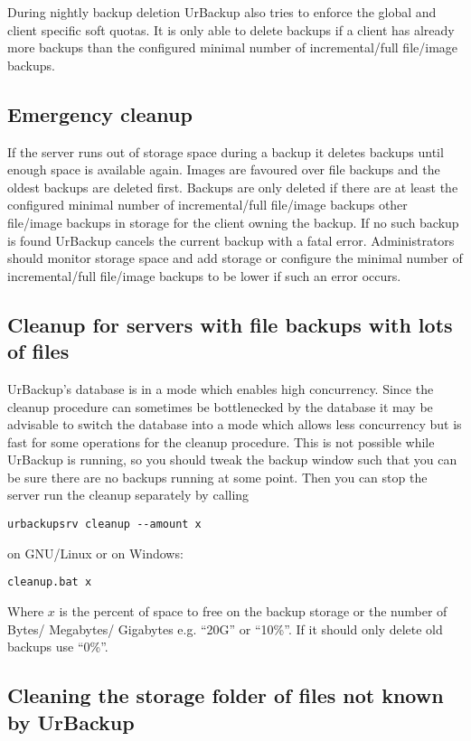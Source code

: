 \documentclass[a4paper,10pt]{article}
\begin{document}
During nightly backup deletion UrBackup also tries to enforce the global and client specific soft quotas. It is only able to delete backups if a client has already more backups than the configured minimal number of incremental/full file/image backups.

\subsection{Emergency cleanup}

If the server runs out of storage space during a backup it deletes backups until enough space is available again. Images are favoured over file backups and the oldest backups are deleted first. Backups are only deleted if there are at least the configured minimal number of incremental/full file/image backups other file/image backups in storage for the client owning the backup. If no such backup is found UrBackup cancels the current backup with a fatal error. Administrators should monitor storage space and add storage or configure the minimal number of incremental/full file/image backups to be lower if such an error occurs.

\subsection{Cleanup for servers with file backups with lots of files}

UrBackup's database is in a mode which enables high concurrency. Since the cleanup procedure
can sometimes be bottlenecked by the database it may be advisable to switch the database into
a mode which allows less concurrency but is fast for some operations for the cleanup procedure. This is not possible while UrBackup is running, so you should tweak the backup window such that you can be sure there are no backups running at some point. Then you can stop the server run the cleanup separately by calling
\begin{verbatim}
urbackupsrv cleanup --amount x
\end{verbatim}
on GNU/Linux or on Windows:
\begin{verbatim}
cleanup.bat x
\end{verbatim}
Where $x$ is the percent of space to free on the backup storage or the number of Bytes/ Megabytes/ Gigabytes e.g. ``20G'' or ``10\%''. If it should only delete old backups
use ``0\%''.

\subsection{Cleaning the storage folder of files not known by UrBackup}
\end{document}
